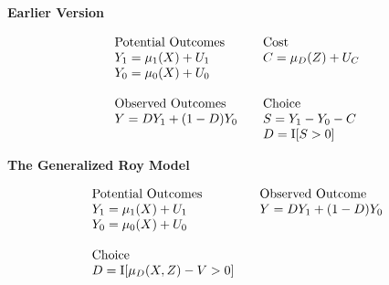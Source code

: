 \begin{frame}
\textbf{Earlier Version}

\begin{align*}\begin{array}{l@{\qquad}l}
\text{Potential Outcomes} & \text{Cost} \\
Y_1 = \mu_1(X) + U_1      &C = \mu_D(Z) + U_C \\
Y_0 = \mu_0(X) + U_0      & \\
    & \\
\text{Observed Outcomes } & \text{Choice} \\
Y = D Y_1 + (1 - D)Y_0 & S = Y_1 - Y_0 - C \\
                       & D = \mathrm{I}[S > 0] \\
\end{array}\end{align*}
\end{frame}


\begin{frame}
\textbf{The Generalized Roy Model}

\begin{align*}\begin{array}{l@{\qquad}l}
\text{Potential Outcomes} &\text{Observed Outcome}\\
Y_1 = \mu_1(X) + U_1      &  Y = D Y_1 + (1 - D)Y_0 \\
Y_0 = \mu_0(X) + U_0      &\\
    & \\
\text{Choice} & \\
D = \mathrm{I}[\mu_D(X, Z) - V > 0] & \\
\end{array}
\end{align*}
\end{frame}
\maketitle

